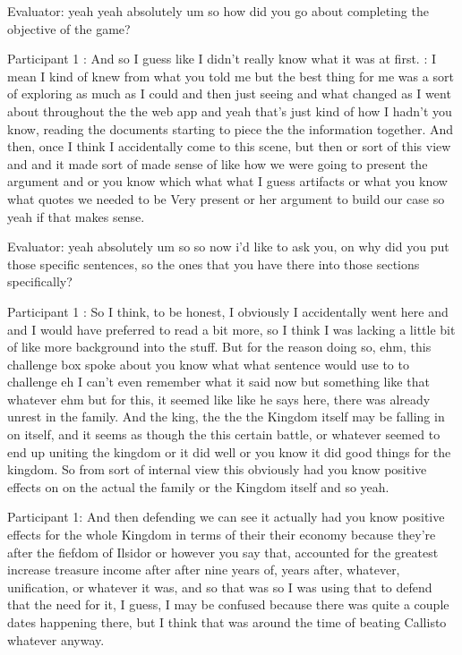 \documentclass{l4proj}
\begin{document}
\begin{appendices}
Evaluator: yeah yeah absolutely um so how did you go about completing the objective of the game?

Participant 1 : And so I guess like I didn't really know what it was at first. : I mean I kind of knew from what you told me but the best thing for me was a sort of exploring as much as I could and then just seeing and what changed as I went about throughout the the web app and yeah that's just kind of how I hadn't you know, reading the documents starting to piece the the information together. And then, once I think I accidentally come to this scene, but then or sort of this view and and it made sort of made sense of like how we were going to present the argument and or you know which what what I guess artifacts or what you know what quotes we needed to be Very present or her argument to build our case so yeah if that makes sense.

Evaluator: yeah absolutely um so so now i'd like to ask you, on why did you put those specific sentences, so the ones that you have there into those sections specifically?

 

Participant 1 : So I think, to be honest, I obviously I accidentally went here and and I would have preferred to read a bit more, so I think I was lacking a little bit of like more background into the stuff. But for the reason doing so, ehm, this challenge box spoke about you know what what sentence would use to to challenge eh I can't even remember what it said now but something like that whatever ehm but for this, it seemed like like he says here, there was already unrest in the family. And the king, the the the Kingdom itself may be falling in on itself, and it seems as though the this certain battle, or whatever seemed to end up uniting the kingdom or it did well or you know it did good things for the kingdom. So from sort of internal view this obviously had you know positive effects on on the actual the family or the Kingdom itself and so yeah. 

 

Participant 1: And then defending we can see it actually had you know positive effects for the whole Kingdom in terms of their their economy because they're after the fiefdom of Ilsidor or however you say that, accounted for the greatest increase treasure income after after nine years of, years after, whatever, unification, or whatever it was, and so that was so I was using that to defend that the need for it, I guess, I may be confused because there was quite a couple dates happening there, but I think that was around the time of beating Callisto whatever anyway.


\end{appendices}
\end{document}
